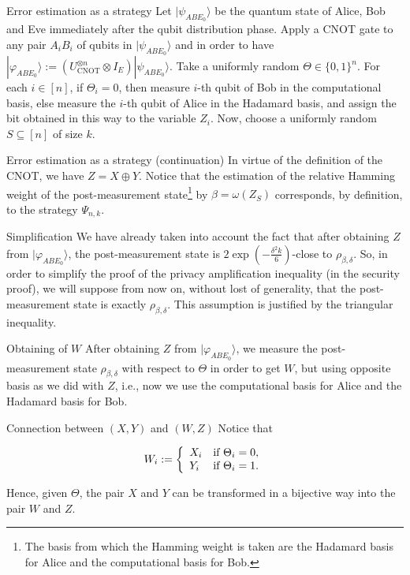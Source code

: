 \documentclass{beamer}
\begin{document}
\begin{frame}{Error estimation as a strategy}
Let $|\psi_{ABE_0} \rangle$ be the quantum state of Alice, Bob and Eve immediately after the qubit distribution phase. Apply a CNOT gate to any pair $A_i B_i$ of qubits in $|\psi_{ABE_0} \rangle$ and in order to have $|\varphi_{ABE_0} \rangle := (U_{\text{CNOT}}^{\otimes n} \otimes I_E) |\psi_{ABE_0} \rangle$. Take a uniformly random $\Theta \in \{0,1\}^n$. For each $i\in[n]$, if $\Theta_i = 0$, then measure $i$-th qubit of Bob in the computational basis, else measure the $i$-th qubit of Alice in the Hadamard basis, and assign the bit obtained in this way to the variable $Z_i$. Now, choose a uniformly random $S \subseteq [n]$ of size $k$. 
\end{frame}

\begin{frame}{Error estimation as a strategy (continuation)}
In virtue of the definition of the CNOT, we have $Z = X \oplus Y$. Notice that the estimation of the relative Hamming weight of the post-measurement state\footnote{The basis from which the Hamming weight is taken are the Hadamard basis for Alice and the computational
basis for Bob.} by $\beta = \omega(Z_S)$ corresponds, by definition, to the strategy $\Psi_{n,k}$.
\end{frame}

\begin{frame}{Simplification}
We have already taken into account the fact that after obtaining $Z$ from $|\varphi_{A B E_0}\rangle$, the post-measurement state is $2\exp\left( -\frac{\delta^2 k}{6} \right)$-close to $\rho_{\beta,\delta}$. So, in order to simplify the proof of the privacy amplification inequality (in the security proof), we will suppose from now on, without lost of generality, that the post-measurement state is exactly $\rho_{\beta,\delta}$. This assumption is justified by the triangular inequality.
\end{frame}

\begin{frame}{Obtaining of $W$}
After obtaining $Z$ from $|\varphi_{A B E_0}\rangle$, we measure the post-measurement state $\rho_{\beta,\delta}$ with respect to $\Theta$ in order to get $W$, but using opposite basis as we did with $Z$, i.e., now we use the computational basis for Alice and the Hadamard basis for Bob.
\end{frame}

\begin{frame}{Connection between $(X,Y)$ and $(W, Z)$}
Notice that

$$
W_i := \left\{\begin{array}{l l} X_i & \text{if } \Theta_i = 0, \\
Y_i & \text{if } \Theta_i = 1.
 \end{array} \right.
$$

Hence, given $\Theta$, the pair $X$ and $Y$ can be transformed in a bijective way into the pair $W$ and $Z$.
\end{frame}
\end{document}
